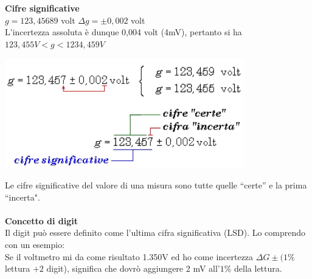 \documentclass{article}
\begin{document}
\textbf{Cifre significative } \\
$g = 123,45689$ volt $\Delta g = \pm 0,002$ volt \\
L'incertezza assoluta è dunque 0,004 volt (4mV), pertanto si ha $123,455 V < g < 1234,459 V$  
\begin{center}
    \includegraphics[scale=0.9]{Cifre Significative.png}
\end{center}
Le cifre significative del valore di una misura sono tutte quelle “certe” e la prima “incerta".\\\\
\textbf{Concetto di digit}\\
Il digit può essere definito come l'ultima cifra significativa (LSD).
Lo comprendo con un esempio:\\
Se il voltmetro mi da come risultato 1.350V ed ho come incertezza $\Delta G \pm (1\% $lettura $ + 2$ digit), significa che dovrò aggiungere 2 mV all'$1\%$ della lettura.\\\\
\end{document}
